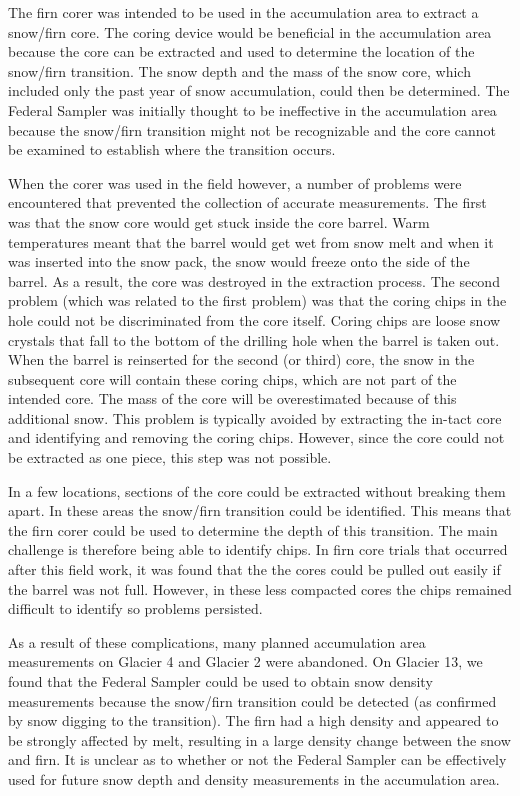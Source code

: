 \documentclass{sfuthesis}
\begin{document}
The firn corer was intended to be used in the accumulation area to extract a snow/firn core. The coring device would be beneficial in the accumulation area because the core can be extracted and used to determine the location of the snow/firn transition. The snow depth and the mass of the snow core, which included only the past year of snow accumulation, could then be determined. The Federal Sampler was {\color{red} initially thought to be ineffective in the accumulation area because the snow/firn transition might not be recognizable and the core cannot be examined to establish where the transition occurs.}

When the corer was used in the field however, a number of problems were encountered that prevented the collection of accurate measurements. The first was that the snow core would get stuck inside the core barrel. Warm temperatures meant that the barrel would get wet from snow melt and when it was inserted into the snow pack, the snow would freeze onto the side of the barrel. As a result, the core was destroyed in the extraction process. The second problem (which was related to the first problem) was that the coring chips in the hole could not be discriminated from the core itself. Coring chips are loose snow crystals that fall to the bottom of the drilling hole when the barrel is taken out. When the barrel is reinserted for the second (or third) core, the snow in the subsequent core will contain these coring chips, which are not part of the intended core. The mass of the core will be overestimated because of this additional snow. This problem is typically avoided by extracting the in-tact core and identifying and removing the coring chips. However, since the core could not be extracted as one piece, this step was not possible. 

In a few locations, sections of the core could be extracted without breaking them apart. In these areas the snow/firn transition could be identified. This means that the firn corer could be used to determine the depth of this transition. The main challenge is therefore being able to identify chips. In firn core trials that occurred after this field work, it was found that the the cores could be pulled out easily if the barrel was not full. However, in these less compacted cores the chips remained difficult to identify so problems persisted. 

As a result of these complications, many planned accumulation area measurements on Glacier 4 and Glacier 2 were abandoned. {\color{red} On Glacier 13, we found that the Federal Sampler could be used to obtain snow density measurements because the snow/firn transition could be detected (as confirmed by snow digging to the transition). The firn had a high density and appeared to be strongly affected by melt, resulting in a large density change between the snow and firn. It is unclear as to whether or not the Federal Sampler can be effectively used for future snow depth and density measurements in the accumulation area.}
\end{document}
